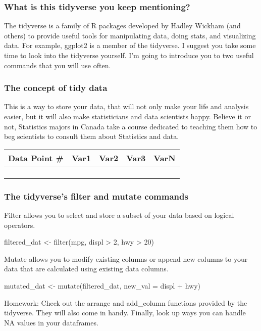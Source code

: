 \documentclass[aspectratio=169]{beamer}
\begin{document}
	\begin{frame}[fragile]
		\frametitle{What is this tidyverse you keep mentioning?}
		The tidyverse is a family of R packages developed by Hadley Wickham (and others) to provide useful tools for manipulating data, doing stats, and visualizing data. For example, ggplot2 is a member of the tidyverse. I suggest you take some time to look into the tidyverse yourself. I'm going to introduce you to two useful commands that you will use often.
		
	\end{frame}

	\begin{frame}[fragile]
		\frametitle{The concept of tidy data}
		This is a way to store your data, that will not only make your life and analysis easier, but it will also make statisticians and data scientists happy. Believe it or not, Statistics majors in Canada take a course dedicated to teaching them how to beg scientists to consult them about Statistics and data. 
		
		\begin{table}
			\begin{tabular}{l | c | c | c | c }
				Data Point \# & Var1 & Var2 & Var3 & VarN \\
				\hline \hline
				&  &  &  & \\ 
				&  &  &  & \\
				&  &  &  & \\
				&  &  &  & 
			\end{tabular}
		\end{table}
		
	\end{frame}

	\begin{frame}[fragile]
		\frametitle{The tidyverse's filter and mutate commands}
		
		Filter allows you to select and store a subset of your data based on logical operators. 
		
		\begin{semiverbatim}
        filtered_dat <- filter(mpg, displ > 2, hwy > 20)
		\end{semiverbatim}
	
		Mutate allows you to modify existing columns or append new columns to your data that are calculated using existing data columns.
		
		\begin{semiverbatim}
        mutated_dat <- mutate(filtered_dat, new_val = displ + hwy)
		\end{semiverbatim}
		
		Homework: Check out the arrange and add\_column functions provided by the tidyverse. They will also come in handy. Finally, look up ways you can handle N\/A values in your dataframes.
		
	\end{frame}
\end{document}

